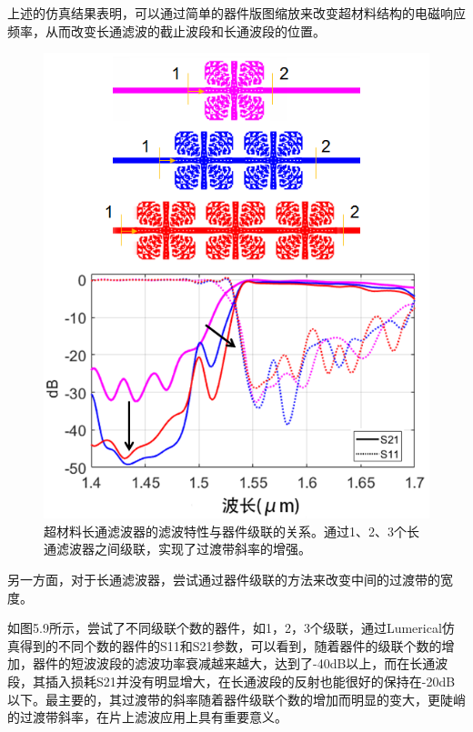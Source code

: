 上述的仿真结果表明，可以通过简单的器件版图缩放来改变超材料结构的电磁响应频率，从而改变长通滤波的截止波段和长通波段的位置。

\begin{figure}[!htbp]
    \centering
    \includegraphics[width=1\textwidth]{Img/5-9.png}
    \caption{超材料长通滤波器的滤波特性与器件级联的关系。通过1、2、3个长通滤波器之间级联，实现了过渡带斜率的增强。}
    \label{fig:5-9}
\end{figure}

另一方面，对于长通滤波器，尝试通过器件级联的方法来改变中间的过渡带的宽度。


如图5.9所示，尝试了不同级联个数的器件，如1，2，3个级联，通过Lumerical仿真得到的不同个数的器件的S11和S21参数，可以看到，随着器件的级联个数的增加，器件的短波波段的滤波功率衰减越来越大，达到了-40dB以上，而在长通波段，其插入损耗S21并没有明显增大，在长通波段的反射也能很好的保持在-20dB以下。最主要的，其过渡带的斜率随着器件级联个数的增加而明显的变大，更陡峭的过渡带斜率，在片上滤波应用上具有重要意义。

